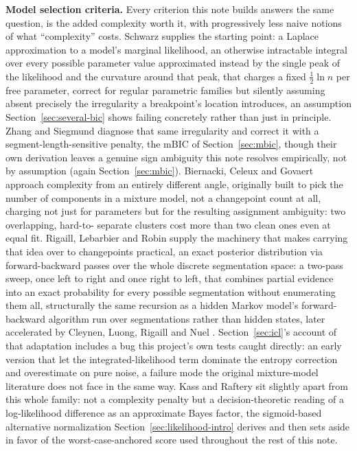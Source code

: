 \documentclass[11pt]{article}
\begin{document}
\textbf{Model selection criteria.} Every criterion this note builds
answers the same question, is the added complexity worth it, with
progressively less naive notions of what ``complexity'' costs. Schwarz
\citep{schwarz1978} supplies the starting point: a Laplace approximation
to a model's marginal likelihood, an otherwise intractable integral over
every possible parameter value approximated instead by the single peak
of the likelihood and the curvature around that peak, that charges a
fixed $\frac{1}{2}\ln n$ per free parameter, correct for regular parametric
families but silently assuming absent precisely the irregularity a
breakpoint's location introduces, an assumption
Section~\ref{sec:several-bic} shows failing concretely rather than just
in principle. Zhang and Siegmund
\citep{zhangsiegmund2007} diagnose that same irregularity and correct
it with a segment-length-sensitive penalty, the $\mathrm{mBIC}$ of
Section~\ref{sec:mbic}, though their own derivation leaves a genuine
sign ambiguity this note resolves empirically, not by assumption (again
Section~\ref{sec:mbic}). Biernacki, Celeux and Govaert
\citep{biernacki2000} approach complexity from an entirely different
angle, originally built to pick the number of components in a mixture
model, not a changepoint count at all, charging not just for parameters
but for the resulting assignment ambiguity: two overlapping, hard-to-
separate clusters cost more than two clean ones even at equal fit.
Rigaill, Lebarbier and Robin \citep{rigaill2012} supply the machinery
that makes carrying that idea over to changepoints practical, an exact
posterior distribution via forward-backward passes over the whole
discrete segmentation space: a two-pass sweep, once left to right and
once right to left, that combines partial evidence into an exact
probability for every possible segmentation without enumerating them
all, structurally the same recursion as a hidden Markov model's
forward-backward algorithm run over segmentations rather than hidden
states, later accelerated by Cleynen, Luong, Rigaill and Nuel
\citep{cleynen2013}. Section~\ref{sec:icl}'s account of that
adaptation includes a bug this project's own tests caught directly: an
early version that let the integrated-likelihood term dominate the
entropy correction and overestimate on pure noise, a failure mode the
original mixture-model literature does not face in the same way. Kass
and Raftery \citep{kassraftery1995} sit slightly apart from this whole
family: not a complexity penalty but a decision-theoretic reading of a
log-likelihood difference as an approximate Bayes factor, the
sigmoid-based alternative normalization Section~\ref{sec:likelihood-intro}
derives and then sets aside in favor of the worst-case-anchored score
used throughout the rest of this note.
\end{document}
